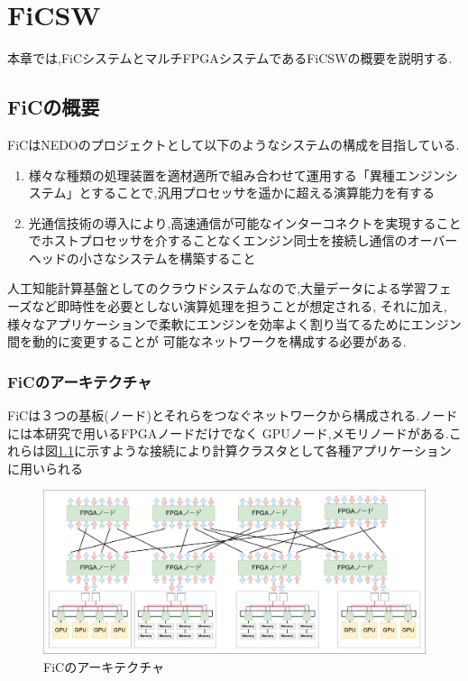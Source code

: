 \chapter{FiCSW}
{
  \label{chap:ficsw}
  本章では,FiCシステムとマルチFPGAシステムであるFiCSWの概要を説明する.
  
  \section{FiCの概要}
  \label{sec:about_fic}
  FiCはNEDOのプロジェクトとして以下のようなシステムの構成を目指している.
  
  \begin{enumerate}
    \item 様々な種類の処理装置を適材適所で組み合わせて運用する「異種エンジンシステム」とすることで,汎用プロセッサを遥かに超える演算能力を有する
    \item 光通信技術の導入により,高速通信が可能なインターコネクトを実現することでホストプロセッサを介することなくエンジン同士を接続し通信のオーバーヘッドの小さなシステムを構築すること
  \end{enumerate}
  
  人工知能計算基盤としてのクラウドシステムなので,大量データによる学習フェーズなど即時性を必要としない演算処理を担うことが想定される,
  それに加え,様々なアプリケーションで柔軟にエンジンを効率よく割り当てるためにエンジン間を動的に変更することが
  可能なネットワークを構成する必要がある.
  
  \subsection{FiCのアーキテクチャ}
  \label{sec:arch_fic}
  FiCは３つの基板(ノード)とそれらをつなぐネットワークから構成される.ノードには本研究で用いるFPGAノードだけでなく
  GPUノード,メモリノードがある.これらは図\ref{fig:arch_fic}に示すような接続により計算クラスタとして各種アプリケーションに用いられる
  
  \begin{figure}[h]
    \centering
    \includegraphics[width=15cm]{./chap3/fig/arch_fic.pdf}
    \caption{FiCのアーキテクチャ}
    \label{fig:arch_fic}
  \end{figure}
  
}
